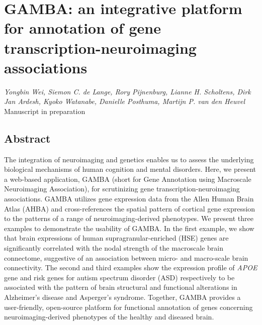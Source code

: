 \pagestyle{MyStyle}

\chapter[GAMBA: an integrative platform for annotation of gene transcription-neuro- \\imaging associations]{GAMBA: an integrative platform for annotation of gene transcription-neuroimaging \\associations}


\label{ch:gamba}

\begin{refsection}

\begin{flushright}
\textit{Yongbin Wei, Siemon C. de Lange, Rory Pijnenburg, Lianne H. Scholtens, Dirk Jan Ardesh, Kyoko Watanabe, Danielle Posthuma, Martijn P. van den Heuvel}\\
Manuscript in preparation

\vspace{7 mm}

\end{flushright}
\newpage

\section*{Abstract}
The integration of neuroimaging and genetics enables us to assess the underlying biological mechanisms of human cognition and mental disorders. Here, we present a web-based application, GAMBA (short for Gene Annotation using Macroscale Neuroimaging Association), for scrutinizing gene transcription-neuroimaging associations. GAMBA utilizes gene expression data from the Allen Human Brain Atlas (AHBA) and cross-references the spatial pattern of cortical gene expression to the patterns of a range of neuroimaging-derived phenotypes. We present three examples to demonstrate the usability of GAMBA. In the first example, we show that brain expressions of human supragranular-enriched (HSE) genes are significantly correlated with the nodal strength of the macroscale brain connectome, suggestive of an association between micro- and macro-scale brain connectivity. The second and third examples show the expression profile of \textit{APOE} gene and risk genes for autism spectrum disorder (ASD) respectively to be associated with the pattern of brain structural and functional alterations in Alzheimer's disease and Asperger's syndrome. Together, GAMBA provides a user-friendly, open-source platform for functional annotation of genes concerning neuroimaging-derived phenotypes of the healthy and diseased brain.


\end{refsection}
